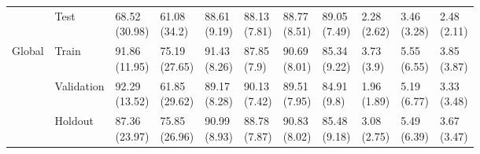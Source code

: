 \begin{table}
\begin{tabular}{lllllllllll}
       & Test &  \makecell{68.52\\(30.98)} &   \makecell{61.08\\(34.2)} &  \makecell{88.61\\(9.19)} &  \makecell{88.13\\(7.81)} &  \makecell{88.77\\(8.51)} &  \makecell{89.05\\(7.49)} &      \makecell{2.28\\(2.62)} &  \makecell{3.46\\(3.28)} &  \makecell{2.48\\(2.11)} \\
Global & Train &  \makecell{91.86\\(11.95)} &  \makecell{75.19\\(27.65)} &  \makecell{91.43\\(8.26)} &   \makecell{87.85\\(7.9)} &  \makecell{90.69\\(8.01)} &  \makecell{85.34\\(9.22)} &       \makecell{3.73\\(3.9)} &  \makecell{5.55\\(6.55)} &  \makecell{3.85\\(3.87)} \\
       & Validation &  \makecell{92.29\\(13.52)} &  \makecell{61.85\\(29.62)} &  \makecell{89.17\\(8.28)} &  \makecell{90.13\\(7.42)} &  \makecell{89.51\\(7.95)} &   \makecell{84.91\\(9.8)} &      \makecell{1.96\\(1.89)} &  \makecell{5.19\\(6.77)} &  \makecell{3.33\\(3.48)} \\
       & Holdout &  \makecell{87.36\\(23.97)} &  \makecell{75.85\\(26.96)} &  \makecell{90.99\\(8.93)} &  \makecell{88.78\\(7.87)} &  \makecell{90.83\\(8.02)} &  \makecell{85.48\\(9.18)} &      \makecell{3.08\\(2.75)} &  \makecell{5.49\\(6.39)} &  \makecell{3.67\\(3.47)} \\

\end{tabular}
\end{table}
